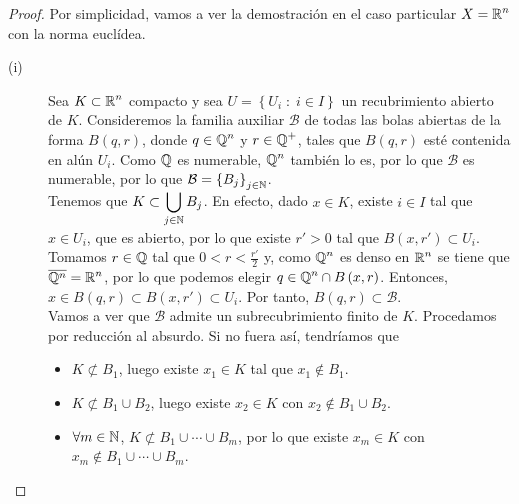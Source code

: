 \begin{proof}
Por simplicidad, vamos a ver la demostración en el caso particular $\displaystyle X = \mathbb{R}^{n} $ con la norma euclídea. 
\begin{description}
	\item[(i)] Sea $\displaystyle K \subset \mathbb{R}^{n} $ compacto y sea $\displaystyle U = \left\{ U_{i} \; : \; i \in I\right\}  $ un recubrimiento abierto de $\displaystyle K $. Consideremos la familia auxiliar $\displaystyle \mathcal{B}  $ de todas las bolas abiertas de la forma $\displaystyle B\left(q,r\right) $, donde $\displaystyle q \in \mathbb{Q}^{n} $ y $\displaystyle r \in \mathbb{Q}^{+} $, tales que $\displaystyle B\left(q,r\right) $ esté contenida en alún $\displaystyle U_{i} $. Como $\displaystyle \mathbb{Q} $ es numerable, $\displaystyle \mathbb{Q}^{n} $ también lo es, por lo que $\displaystyle \mathcal{B} $ es numerable, por lo que $\displaystyle \mathcal{B} = \left\{ B_{j}\right\}_{j \in \mathbb{N}} $. \\
		Tenemos que $\displaystyle K \subset \bigcup_{j \in \mathbb{N}}B_{j} $. En efecto, dado $\displaystyle x \in K $, existe $\displaystyle i \in I $ tal que $\displaystyle x \in U_{i} $, que es abierto, por lo que existe $\displaystyle r' > 0 $ tal que $\displaystyle B\left(x,r'\right)\subset U_{i} $. Tomamos $\displaystyle r \in \mathbb{Q} $ tal que $\displaystyle 0 < r < \frac{r'}{2} $ y, como $\displaystyle \mathbb{Q}^{n} $ es denso en $\displaystyle \mathbb{R}^{n} $ se tiene que $\displaystyle \overline{\mathbb{Q}^{n}} = \mathbb{R}^{n} $, por lo que podemos elegir $\displaystyle q \in \mathbb{Q}^{n} \cap B\left(x,r\right) $. 
		Entonces, $\displaystyle x \in B\left(q,r\right) \subset B\left(x,r'\right)\subset U_{i} $. Por tanto, $\displaystyle B\left(q,r\right) \subset \mathcal{B} $. \\
		Vamos a ver que $\displaystyle \mathcal{B} $ admite un subrecubrimiento finito de $\displaystyle K $. Procedamos por reducción al absurdo. Si no fuera así, tendríamos que
		\begin{itemize}
		\item $\displaystyle K \not\subset B_{1} $, luego existe $\displaystyle x_{1} \in K $ tal que $\displaystyle x_{1} \not\in B_{1} $.
		\item $\displaystyle K \not\subset B_{1} \cup B_{2} $, luego existe $\displaystyle x_{2} \in K $ con $\displaystyle x_{2} \not\in B_{1} \cup B_{2} $.
		\item $\displaystyle \forall m \in \mathbb{N} $, $\displaystyle K \not \subset B_{1} \cup \cdots \cup B_{m} $, por lo que existe $\displaystyle x_{m} \in K $ con $\displaystyle x_{m} \not\in B_{1} \cup \cdots \cup B_{m} $. 

\end{itemize}
\end{description}
\end{proof}
